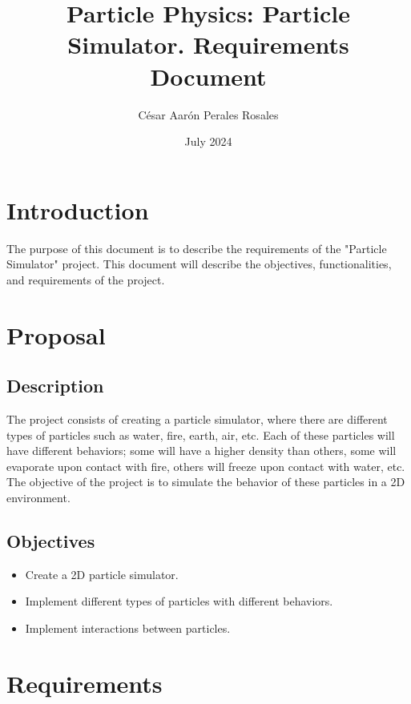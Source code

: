 \documentclass{article}
\title{Particle Physics: Particle Simulator. Requirements Document}
\author{César Aarón Perales Rosales}
\date{July 2024}
\begin{document}
\maketitle

\newpage

\tableofcontents

\newpage

\section{Introduction}
The purpose of this document is to describe the requirements of the "Particle Simulator" project. This document will describe the objectives, functionalities, and requirements of the project.

\section{Proposal}

\subsection{Description}

The project consists of creating a particle simulator, where there are different types of particles such as water, fire, earth, air, etc. Each of these particles will have different behaviors; some will have a higher density than others, some will evaporate upon contact with fire, others will freeze upon contact with water, etc. The objective of the project is to simulate the behavior of these particles in a 2D environment.

\subsection{Objectives}

\begin{itemize}
    \item Create a 2D particle simulator.
    \item Implement different types of particles with different behaviors.
    \item Implement interactions between particles.
\end{itemize}

\section{Requirements}
\end{document}
